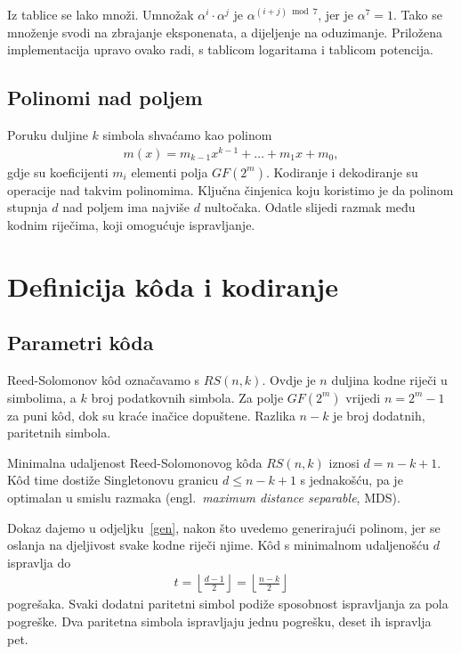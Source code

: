 \documentclass{mathos}
\begin{document}
\noindent
Iz tablice se lako množi. Umnožak $\alpha^i \cdot \alpha^j$ je $\alpha^{(i+j) \bmod 7}$, jer je $\alpha^7 = 1$. Tako se množenje svodi na zbrajanje eksponenata, a dijeljenje na oduzimanje. Priložena implementacija upravo ovako radi, s tablicom logaritama i tablicom potencija.

\section{Polinomi nad poljem}

Poruku duljine $k$ simbola shvaćamo kao polinom
\begin{align*}
    m(x) = m_{k-1} x^{k-1} + \dots + m_1 x + m_0,
\end{align*}
gdje su koeficijenti $m_i$ elementi polja $GF(2^m)$. Kodiranje i dekodiranje su operacije nad takvim polinomima. Ključna činjenica koju koristimo je da polinom stupnja $d$ nad poljem ima najviše $d$ nultočaka. Odatle slijedi razmak među kodnim riječima, koji omogućuje ispravljanje.


\chapter{Definicija kôda i kodiranje}\label{kodiranje}

\section{Parametri kôda}

Reed-Solomonov kôd označavamo s $RS(n, k)$. Ovdje je $n$ duljina kodne riječi u simbolima, a $k$ broj podatkovnih simbola. Za polje $GF(2^m)$ vrijedi $n = 2^m - 1$ za puni kôd, dok su kraće inačice dopuštene. Razlika $n - k$ je broj dodatnih, paritetnih simbola.

\begin{teorem}\label{tm:mds}
Minimalna udaljenost Reed-Solomonovog kôda $RS(n,k)$ iznosi $d = n - k + 1$. Kôd time dostiže Singletonovu granicu $d \le n - k + 1$ s jednakošću, pa je optimalan u smislu razmaka (engl.\ \emph{maximum distance separable}, MDS).
\end{teorem}

\noindent
Dokaz dajemo u odjeljku~\ref{gen}, nakon što uvedemo generirajući polinom, jer se oslanja na djeljivost svake kodne riječi njime. Kôd s minimalnom udaljenošću $d$ ispravlja do
\begin{align*}
    t = \left\lfloor \frac{d-1}{2} \right\rfloor = \left\lfloor \frac{n-k}{2} \right\rfloor
\end{align*}
pogrešaka. Svaki dodatni paritetni simbol podiže sposobnost ispravljanja za pola pogreške. Dva paritetna simbola ispravljaju jednu pogrešku, deset ih ispravlja pet.
\end{document}
